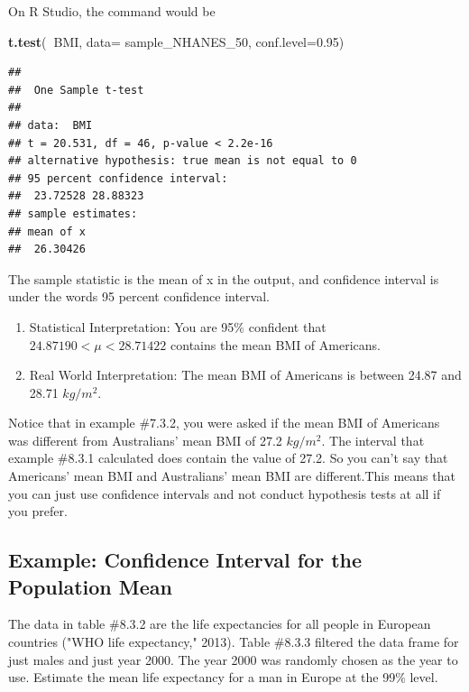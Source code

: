 \documentclass[
]{book}
\newenvironment{Shaded}{\begin{snugshade}}{\end{snugshade}}
\newcommand{\DataTypeTok}[1]{\textcolor[rgb]{0.13,0.29,0.53}{#1}}
\newcommand{\DecValTok}[1]{\textcolor[rgb]{0.00,0.00,0.81}{#1}}
\newcommand{\FloatTok}[1]{\textcolor[rgb]{0.00,0.00,0.81}{#1}}
\newcommand{\KeywordTok}[1]{\textcolor[rgb]{0.13,0.29,0.53}{\textbf{#1}}}
\newcommand{\NormalTok}[1]{#1}
\newcommand{\OperatorTok}[1]{\textcolor[rgb]{0.81,0.36,0.00}{\textbf{#1}}}
\begin{document}
On R Studio, the command would be

\begin{Shaded}
\begin{Highlighting}[]
\KeywordTok{t.test}\NormalTok{(}\OperatorTok{~}\NormalTok{BMI, }\DataTypeTok{data=}\NormalTok{ sample_NHANES_}\DecValTok{50}\NormalTok{, }\DataTypeTok{conf.level=}\FloatTok{0.95}\NormalTok{)}
\end{Highlighting}
\end{Shaded}

\begin{verbatim}
## 
##  One Sample t-test
## 
## data:  BMI
## t = 20.531, df = 46, p-value < 2.2e-16
## alternative hypothesis: true mean is not equal to 0
## 95 percent confidence interval:
##  23.72528 28.88323
## sample estimates:
## mean of x 
##  26.30426
\end{verbatim}

The sample statistic is the mean of x in the output, and confidence interval is under the words 95 percent confidence interval.

\begin{enumerate}
\def\labelenumi{\arabic{enumi}.}
\setcounter{enumi}{3}
\item
  Statistical Interpretation: You are 95\% confident that \(24.87190<\mu<28.71422\) contains the mean BMI of Americans.
\item
  Real World Interpretation: The mean BMI of Americans is between 24.87 and 28.71 \(kg/m^2\).
\end{enumerate}

Notice that in example \#7.3.2, you were asked if the mean BMI of Americans was different from Australians' mean BMI of 27.2 \(kg/m^2\). The interval that example \#8.3.1 calculated does contain the value of 27.2. So you can't say that Americans' mean BMI and Australians' mean BMI are different.This means that you can just use confidence intervals and not conduct hypothesis tests at all if you prefer.

\hypertarget{example-confidence-interval-for-the-population-mean-1}{%
\subsection{Example: Confidence Interval for the Population Mean}\label{example-confidence-interval-for-the-population-mean-1}}

The data in table \#8.3.2 are the life expectancies for all people in European countries ("WHO life expectancy," 2013). Table \#8.3.3 filtered the data frame for just males and just year 2000. The year 2000 was randomly chosen as the year to use. Estimate the mean life expectancy for a man in Europe at the 99\% level.
\end{document}
